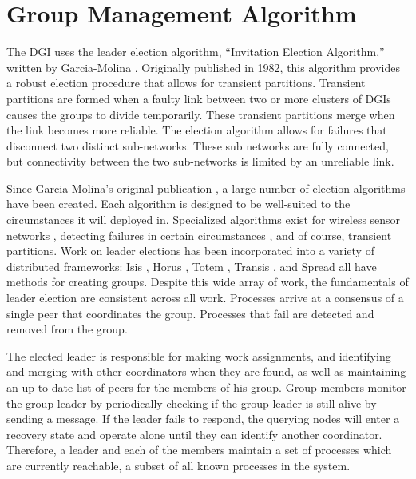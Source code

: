 \section{Group Management Algorithm}

The DGI uses the leader election algorithm, ``Invitation Election Algorithm,'' written by Garcia-Molina \cite{INVITATIONELECTION}.
Originally published in 1982, this algorithm provides a robust election  procedure that allows for transient partitions.
Transient partitions are formed when a faulty link between two or more clusters of DGIs causes the groups to divide temporarily.
These transient partitions merge when the link becomes more reliable.
The election algorithm allows for failures that disconnect two distinct sub-networks.
These sub networks are fully connected, but connectivity between the two sub-networks is limited by an unreliable link.

Since Garcia-Molina's original publication \cite{INVITATIONELECTION}, a large number of election algorithms have been created. 
Each algorithm is designed to be well-suited to the circumstances it will deployed in.
Specialized algorithms exist for wireless sensor networks \cite{LE-WSN-1}\cite{LE-WSN-2}, detecting failures in certain circumstances \cite{LE-SPECIALCIRCUMSTANCES-1}\cite{LE-SPECIALCIRCUMSTANCES-2}, and of course, transient partitions.
Work on leader elections has been incorporated into a variety of distributed frameworks: Isis \cite{ISISTOOLKIT}, Horus \cite{HORUSTOOLKIT}, Totem \cite{TOTEMTOOLKIT}, Transis \cite{TRANSISTOOLKIT}, and Spread \cite{SPREADTOOLKIT} all have methods for creating groups.
Despite this wide array of work, the fundamentals of leader election are consistent
across all work.
Processes arrive at a consensus of a single peer that coordinates the group.
Processes that fail are detected and removed from the group. 

The elected leader is responsible for making work assignments, and identifying and merging with other coordinators when they are found, as well as maintaining an up-to-date list of peers for the members of his group. 
Group members monitor the group leader by periodically checking if the group leader is still alive by sending a message. 
If the leader fails to respond, the querying nodes will enter a recovery state and operate alone until
they can identify another coordinator.
Therefore, a leader and each of the members maintain a set of processes which are currently reachable, a subset of all known processes in the system.

